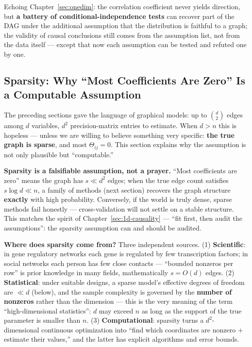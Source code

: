 Echoing Chapter~\ref{sec:onedim}: the correlation coefficient never yields direction, but \textbf{a battery of conditional-independence tests} can recover part of the DAG under the additional assumption that the distribution is faithful to a graph; the validity of causal conclusions still comes from the assumption list, not from the data itself — except that now each assumption can be tested and refuted one by one.

\subsection{Sparsity: Why ``Most Coefficients Are Zero'' Is a Computable Assumption}\label{sec:sparsity}

The preceding sections gave the language of graphical models: up to $\binom{d}{2}$ edges among $d$ variables, $d^2$ precision-matrix entries to estimate. When $d > n$ this is hopeless — unless we are willing to believe something very specific: \textbf{the true graph is sparse}, and most $\Theta_{ij} = 0$. This section explains why the assumption is not only plausible but ``computable.''

\textbf{Sparsity is a falsifiable assumption, not a prayer.} ``Most coefficients are zero'' means the graph has $s \ll d^2$ edges; when the true edge count satisfies $s \log d \ll n$, a family of methods (next section) recovers the graph structure \textbf{exactly} with high probability. Conversely, if the world is truly dense, sparse methods fail honestly — cross-validation will not settle on a stable structure. This matches the spirit of Chapter~\ref{sec:1d-causality} --- ``fit first, then audit the assumptions'': the sparsity assumption can and should be audited.

\textbf{Where does sparsity come from?} Three independent sources. (1) \textbf{Scientific}: in gene regulatory networks each gene is regulated by few transcription factors; in social networks each person has few close contacts — ``bounded nonzeros per row'' is prior knowledge in many fields, mathematically $s = O(d)$ edges. (2) \textbf{Statistical}: under suitable designs, a sparse model's effective degrees of freedom are $\ll d$ (below), and the sample complexity is governed by the \textbf{number of nonzeros} rather than the dimension — this is the very meaning of the term ``high-dimensional statistics'': $d$ may exceed $n$ as long as the support of the true parameter is smaller than $n$. (3) \textbf{Computational}: sparsity turns a $d^2$-dimensional continuous optimization into ``find which coordinates are nonzero $+$ estimate their values,'' and the latter has explicit algorithms and error bounds.

